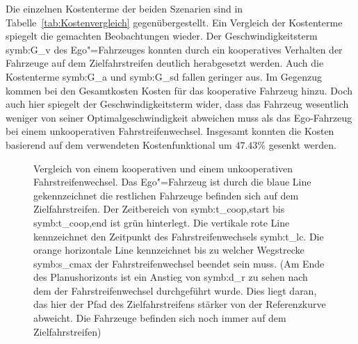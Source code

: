 Die einzelnen Kostenterme der beiden Szenarien sind in Tabelle~\ref{tab:Kostenvergleich} gegen\"ubergestellt.
Ein Vergleich der Kostenterme spiegelt die gemachten Beobachtungen wieder.
Der Geschwindigkeitsterm \gls{symb:G_v} des Ego"=Fahrzeuges konnten durch ein kooperatives Verhalten der Fahrzeuge auf dem Zielfahrstreifen deutlich herabgesetzt werden.
Auch die Kostenterme \gls{symb:G_a} und \gls{symb:G_sd}  fallen geringer aus.
Im Gegenzug kommen bei den Gesamtkosten Kosten f\"ur das kooperative Fahrzeug hinzu.
Doch auch hier spiegelt der Geschwindigkeitsterm wider, dass das Fahrzeug wesentlich weniger von seiner Optimalgeschwindigkeit abweichen muss als das Ego-Fahrzeug bei einem unkooperativen Fahrstreifenwechsel.
Insgesamt konnten die Kosten basierend auf dem verwendeten Kostenfunktional um \(47.43\%\) gesenkt werden.

\begin{figure}[!htbp]
    \centering
    \caption[Fahrstreifenwechsel Vergleich]{Vergleich von einem kooperativen und einem unkooperativen Fahrstreifenwechsel. 
    Das Ego"=Fahrzeug ist durch die blaue Line gekennzeichnet die restlichen Fahrzeuge befinden sich auf dem Zielfahrstreifen.
    Der Zeitbereich von \gls{symb:t_coop,start} bis \gls{symb:t_coop,end} ist gr\"un hinterlegt. Die vertikale rote Line kennzeichnet den Zeitpunkt des Fahrstreifenwechsels \gls{symb:t_lc}. Die orange horizontale Line kennzeichnet bis zu welcher Wegstrecke \gls{symb:s_cmax} der Fahrstreifenwechsel beendet sein muss.
    (Am Ende des Planushorizonts ist ein Anstieg von \gls{symb:d_r} zu sehen nach dem der Fahrstreifenwechsel durchgef\"uhrt wurde. Dies liegt daran, das hier der Pfad des Zielfahrstreifens st\"arker von der Referenzkurve abweicht. Die Fahrzeuge befinden sich noch immer auf dem Zielfahrstreifen)}
    \label{fig:Vergleich}
\end{figure}


